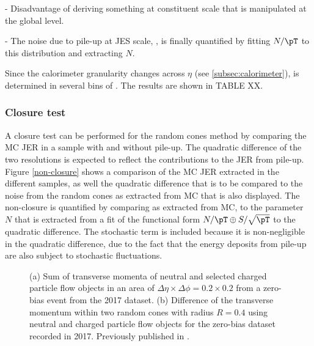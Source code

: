 - Disadvantage of deriving something at constituent scale that is manipulated at the global level.

- The noise due to pile-up at JES scale, \Npileup, is finally quantified by fitting $N/\pT$ to this distribution and extracting $N$.


Since the calorimeter granularity changes across $\eta$ (see \cref{subsec:calorimeter}), \Npileup is determined in several bins of \absetadet. 
The results are shown in TABLE XX. 


\subsubsection{Closure test}
A closure test can be performed for the random cones method by comparing the MC JER in a sample with and without pile-up. The quadratic difference of the two resolutions is expected to reflect the contributions to the JER from pile-up. Figure \cref{non-closure} shows a comparison of the MC JER extracted in the different samples, as well the quadratic difference that is to be compared to the noise from the random cones as extracted from MC that is also displayed. The non-closure is quantified by comparing \Npileup as extracted from MC, to the parameter $N$ that is extracted from a fit of the functional form $N/\pT \oplus S/\sqrt{\pT}$ to the quadratic difference. The stochastic term is included because it is non-negligible in the quadratic difference, due to the fact that the energy deposits from pile-up are also subject to stochastic fluctuations.

\FloatBarrier
\begin{figure}[t]
    \caption{(a) Sum of transverse momenta of neutral and selected charged particle flow objects in an area of $\Delta \eta \times \Delta \phi = 0.2 \times 0.2$ from a zero-bias event from the 2017 dataset. (b) Difference of the transverse momentum within two random cones with radius $R = 0.4$ using neutral and charged particle flow objects for the zero-bias dataset recorded in 2017.
        Previously published in .}
    \label{fig:random-cones-balance}
\end{figure}

